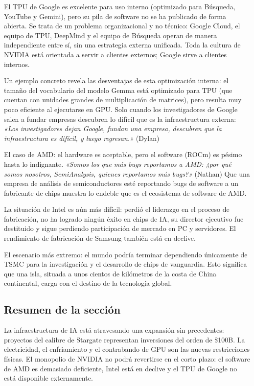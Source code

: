 \documentclass[a4paper]{article}
\begin{document}
El TPU de Google es excelente para uso interno (optimizado para Búsqueda, YouTube y Gemini), pero su pila de software no se ha publicado de forma abierta. Se trata de un problema organizacional y no técnico: Google Cloud, el equipo de TPU, DeepMind y el equipo de Búsqueda operan de manera independiente entre sí, sin una estrategia externa unificada. Toda la cultura de NVIDIA está orientada a servir a clientes externos; Google sirve a clientes internos.

Un ejemplo concreto revela las desventajas de esta optimización interna: el tamaño del vocabulario del modelo Gemma está optimizado para TPU (que cuentan con unidades grandes de multiplicación de matrices), pero resulta muy poco eficiente al ejecutarse en GPU. Solo cuando los investigadores de Google salen a fundar empresas descubren lo difícil que es la infraestructura externa: \textit{«Los investigadores dejan Google, fundan una empresa, descubren que la infraestructura es difícil, y luego regresan.»} (Dylan)

El caso de AMD: el hardware es aceptable, pero el software (ROCm) es pésimo hasta lo indignante. \textit{«Somos los que más bugs reportamos a AMD: ¿por qué somos nosotros, SemiAnalysis, quienes reportamos más bugs?»} (Nathan) Que una empresa de análisis de semiconductores esté reportando bugs de software a un fabricante de chips muestra lo endeble que es el ecosistema de software de AMD.

La situación de Intel es aún más difícil: perdió el liderazgo en el proceso de fabricación, no ha logrado ningún éxito en chips de IA, su director ejecutivo fue destituido y sigue perdiendo participación de mercado en PC y servidores. El rendimiento de fabricación de Samsung también está en declive.

El escenario más extremo: el mundo podría terminar dependiendo únicamente de TSMC para la investigación y el desarrollo de chips de vanguardia. Esto significa que una isla, situada a unos cientos de kilómetros de la costa de China continental, carga con el destino de la tecnología global.

\subsection{Resumen de la sección}

La infraestructura de IA está atravesando una expansión sin precedentes: proyectos del calibre de Stargate representan inversiones del orden de \$100B. La electricidad, el enfriamiento y el contrabando de GPU son las nuevas restricciones físicas. El monopolio de NVIDIA no podrá revertirse en el corto plazo: el software de AMD es demasiado deficiente, Intel está en declive y el TPU de Google no está disponible externamente.
\end{document}
